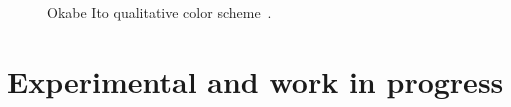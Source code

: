 \documentclass{scrartcl}
\begin{document}
\begin{figure}[ht]
    \centering
    \caption{Okabe Ito qualitative color scheme~\cite{Ichihara_2008}.}
    \label{fig:OI}
\end{figure}


\section{Experimental and work in progress}

\let\oldcolor\color

\newcommand\normalvision{%
    \protect\renewcommand\color[1]{\oldcolor{##1}}%
}

\newcommand\protanopia{%
    \protect\renewcommand\color[1]{%
        \extractcolorspecs{##1}{\modelspec}{\colorspec}%
        \tikzmath{
            \r = array({\colorspec},0);
            \g = array({\colorspec},1);
            \b = array({\colorspec},2);
            \rp = pow(0.06425 + 0.677*pow(\g, 2.2) + 0.2802*pow(\r, 2.2), 1./2.2);
            \gp = pow(0.06425 + 0.677*pow(\g, 2.2) + 0.2802*pow(\r, 2.2), 1./2.2);
            \bp = pow(0.06425 + 0.95724*pow(\b, 2.2) + 0.02138*pow(\g, 2.2) - 0.02138*pow(\r, 2.2), 1./2.2);
        }%
        \oldcolor[rgb]{\rp,\gp,\bp}%
    }%
}

\newcommand\deuteranopia{%
    \protect\renewcommand\color[1]{%
        \extractcolorspecs{##1}{\modelspec}{\colorspec}%
        \tikzmath{
            \r = array({\colorspec},0);
            \g = array({\colorspec},1);
            \b = array({\colorspec},2);
            \rp = pow(0.01194 + 0.8806*pow(\g, 2.2) + 0.1115*pow(\r, 2.2), 1./2.2);
            \gp = pow(0.01194 + 0.8806*pow(\g, 2.2) + 0.1115*pow(\r, 2.2), 1./2.2);
            \bp = pow(0.01194 + 0.992052*pow(\b, 2.2) - 0.003974*pow(\g, 2.2) + 0.003974*pow(\r, 2.2), 1./2.2);
        }%
        \oldcolor[rgb]{\rp,\gp,\bp}%
    }%
}
\end{document}
